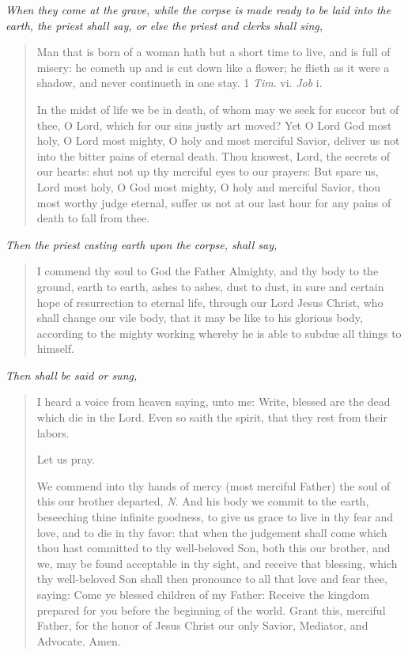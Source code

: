 \documentclass[
]{book}
\begin{document}
\emph{When they come at the grave, while the corpse is made ready to be laid into the earth, the priest shall say, or else the priest and clerks shall sing,}

\begin{quote}
Man that is born of a woman hath but a short time to live, and is full of misery: he cometh up and is cut down like a flower; he flieth as it were a shadow, and never continueth in one stay. 1 \emph{Tim}. vi. \emph{Job} i.

In the midst of life we be in death, of whom may we seek for succor but of thee, O Lord, which for our sins justly art moved? Yet O Lord God most holy, O Lord most mighty, O holy and most merciful Savior, deliver us not into the bitter pains of eternal death. Thou knowest, Lord, the secrets of our hearts: shut not up thy merciful eyes to our prayers: But spare us, Lord most holy, O God most mighty, O holy and merciful Savior, thou most worthy judge eternal, suffer us not at our last hour for any pains of death to fall from thee.
\end{quote}

\emph{Then the priest casting earth upon the corpse, shall say,}

\begin{quote}
I commend thy soul to God the Father Almighty, and thy body to the ground, earth to earth, ashes to ashes, dust to dust, in sure and certain hope of resurrection to eternal life, through our Lord Jesus Christ, who shall change our vile body, that it may be like to his glorious body, according to the mighty working whereby he is able to subdue all things to himself.
\end{quote}

\emph{Then shall be said or sung,}

\begin{quote}
I heard a voice from heaven saying, unto me: Write, blessed are the dead which die in the Lord. Even so saith the spirit, that they rest from their labors.

Let us pray.

We commend into thy hands of mercy (most merciful Father) the soul of this our brother departed, \emph{N}. And his body we commit to the earth, beseeching thine infinite goodness, to give us grace to live in thy fear and love, and to die in thy favor: that when the judgement shall come which thou hast committed to thy well-beloved Son, both this our brother, and we, may be found acceptable in thy sight, and receive that blessing, which thy well-beloved Son shall then pronounce to all that love and fear thee, saying: Come ye blessed children of my Father: Receive the kingdom prepared for you before the beginning of the world. Grant this, merciful Father, for the honor of Jesus Christ our only Savior, Mediator, and Advocate. Amen.
\end{quote}
\end{document}
